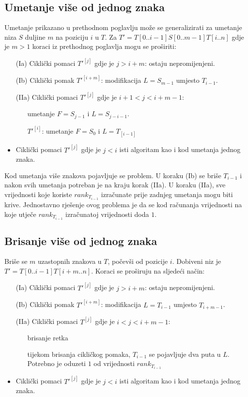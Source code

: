 \documentclass{ferseminar}
\begin{document}
\subsection{Umetanje više od jednog znaka}
Umetanje prikazano u prethodnom poglavlju može se generalizirati za umetanje niza $S$ duljine $m$ na poziciju $i$ u $T$. Za $T'=T[0..i-1]S[0..m-1]T[i..n]$ gdje je $m>1$ koraci iz prethodnog poglavlja mogu se proširiti:
\begin{itemize}
	\item[(Ia)] Ciklički pomaci $T'^{[j]}$ gdje je $j>i+m$: ostaju nepromijenjeni.
	\item[(Ib)] Ciklički pomak $T'^{[i+m]}$: modifikacija $L=S_{m-1}$ umjesto $T_{i-1}$.
	\item[(IIa)] Ciklički pomaci $T'^{[j]}$ gdje je $i+1<j<i+m-1$:
	\begin{itemize}
		\item[] umetanje $F=S_{j-1}$ i $L=S_{j-i-1}$.
		\item[$T'^{[i]}$:] umetanje  $F=S_0$ i $L=T_{[i-1]}$
	\end{itemize}
	\item Ciklički pomaci $T'^{[j]}$ gdje je $j<i$ isti algoritam kao i kod umetanja jednog znaka.
\end{itemize}
Kod umetanja više znakova pojavljuje se problem. U koraku (Ib) se briše $T_{i-1}$ i nakon svih umetanja potreban je na kraju korak (IIa). U koraku (IIa), sve vrijednosti koje koriste $rank_{T_{i-1}}$ izračunate prije zadnjeg umetanja mogu biti krive. Jednostavno rješenje ovog problema je da se kod računanja vrijednosti na koje utječe $rank_{T_{i-1}}$ izračunatoj vrijednosti doda $1$.
\subsection{Brisanje više od jednog znaka}
Briše se $m$ uzastopnih znakova u $T$, počevši od pozicije $i$. Dobiveni niz je $T'=T[0..i-1]T[i+m..n]$. Koraci se proširuju na sljedeći način:
\begin{itemize}
	\item[(Ia)] Ciklički pomaci $T'^{[j]}$ gdje je $j>i+m$: ostaju nepromijenjeni.
	\item[(Ib)] Ciklički pomak $T'^{[i+m]}$: modifikacija $L=T_{i-1}$ umjesto $T_{i+m-1}$.
	\item[(IIa)] Ciklički pomaci $T^{[j]}$ gdje je $i<j<i+m-1$:
	\begin{itemize}
		\item[] brisanje retka
		\item[] tijekom brisanja cikličkog pomaka, $T_{i-1}$ se pojavljuje dva puta u $L$. Potrebno je oduzeti $1$ od vrijednosti $rank_{T_{i-1}}$
	\end{itemize}
	\item Ciklički pomaci $T'^{[j]}$ gdje je $j<i$ isti algoritam kao i kod umetanja jednog znaka.
\end{itemize}
\end{document}
